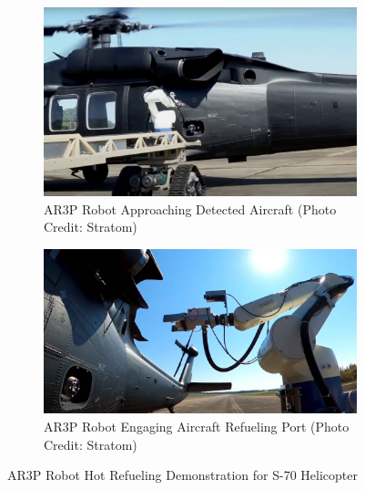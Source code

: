 \documentclass[12pt,oneside]{book} %
\begin{document}
\begin{figure}[H]
    \centering
    \begin{subfigure}[b]{0.45\textwidth}
        \includegraphics[height=0.68\textwidth, width=\textwidth]{figures/test_2020_2.png}
        \caption{AR3P Robot Approaching Detected Aircraft (Photo Credit: Stratom)}\label{test-2020-2}
    \end{subfigure}
    \hfill
    \begin{subfigure}[b]{0.45\textwidth}
        \includegraphics[height=0.68\textwidth, width=\textwidth]{figures/test_2020_3.jpg}
        \caption{AR3P Robot Engaging Aircraft Refueling Port (Photo Credit: Stratom)}\label{test-2020-3}
    \end{subfigure}
    \caption{AR3P Robot Hot Refueling Demonstration for S-70 Helicopter}\label{fig:automated-refuelling-systems}
\end{figure}
\end{document}
